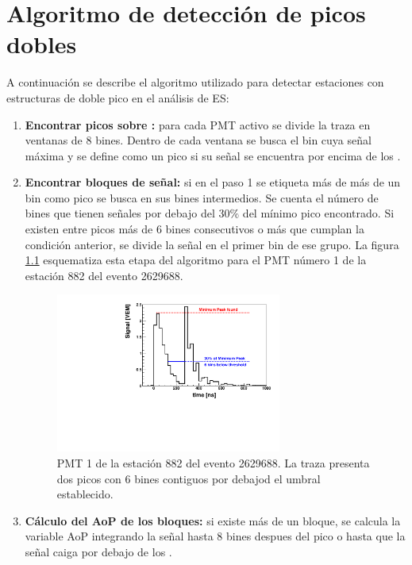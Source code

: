 \chapter{Algoritmo de detecci\'on de picos dobles}
\label{ap:doublePeakDet}

A continuaci\'on se describe el algoritmo utilizado para detectar estaciones con estructuras de doble pico en el an\'alisis de ES:

\begin{enumerate}
	 \item \textbf{Encontrar picos sobre :} para cada PMT activo se divide la traza en ventanas de 8 bines. Dentro de cada ventana se busca el bin cuya señal máxima y se define como un pico si su señal se encuentra por encima de los .
	 \item \textbf{Encontrar bloques de señal:} si en el paso 1 se etiqueta más de más de un bin como pico se busca en sus bines intermedios.
	 Se cuenta el número de bines que tienen señales por debajo del $30\%$ del mínimo pico encontrado. 
	 Si existen entre picos más de 6 bines consecutivos o más que cumplan la condición anterior, se divide la señal en el primer bin de ese grupo.
	 La figura \ref{fig:doublePeakEvent2} esquematiza esta etapa del algoritmo para el PMT número 1 de la estación 882 del evento 2629688.
	 \begin{figure}[ht]
	 \begin{center}
	 \includegraphics[width=0.7\textwidth]{fig/seleccionAuger/ev2629688_pmt1_anode}
	\caption{PMT 1 de la estación 882 del evento 2629688. La traza presenta dos picos con 6 bines contiguos por debajod el umbral establecido.}
	\label{fig:doublePeakEvent2}
	\end{center}
	\end{figure}
	 \item \textbf{Cálculo del AoP de los bloques:} si existe más de un bloque, se calcula la variable AoP integrando la señal hasta 8 bines despues del pico o hasta que la señal caiga por debajo de los .

\end{enumerate}
